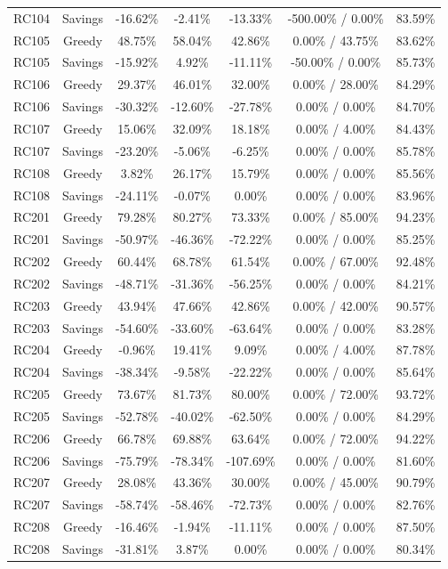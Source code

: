 \documentclass[conference]{IEEEtran}
\begin{document}
\begin{table}[htbp]
{\begin{tabular}{lcccccc}
RC104 & Savings & -16.62\% & -2.41\% & -13.33\% & -500.00\% / 0.00\% & 83.59\% \\
RC105 & Greedy & 48.75\% & 58.04\% & 42.86\% & 0.00\% / 43.75\% & 83.62\% \\
RC105 & Savings & -15.92\% & 4.92\% & -11.11\% & -50.00\% / 0.00\% & 85.73\% \\
RC106 & Greedy & 29.37\% & 46.01\% & 32.00\% & 0.00\% / 28.00\% & 84.29\% \\
RC106 & Savings & -30.32\% & -12.60\% & -27.78\% & 0.00\% / 0.00\% & 84.70\% \\
RC107 & Greedy & 15.06\% & 32.09\% & 18.18\% & 0.00\% / 4.00\% & 84.43\% \\
RC107 & Savings & -23.20\% & -5.06\% & -6.25\% & 0.00\% / 0.00\% & 85.78\% \\
RC108 & Greedy & 3.82\% & 26.17\% & 15.79\% & 0.00\% / 0.00\% & 85.56\% \\
RC108 & Savings & -24.11\% & -0.07\% & 0.00\% & 0.00\% / 0.00\% & 83.96\% \\
RC201 & Greedy & 79.28\% & 80.27\% & 73.33\% & 0.00\% / 85.00\% & 94.23\% \\
RC201 & Savings & -50.97\% & -46.36\% & -72.22\% & 0.00\% / 0.00\% & 85.25\% \\
RC202 & Greedy & 60.44\% & 68.78\% & 61.54\% & 0.00\% / 67.00\% & 92.48\% \\
RC202 & Savings & -48.71\% & -31.36\% & -56.25\% & 0.00\% / 0.00\% & 84.21\% \\
RC203 & Greedy & 43.94\% & 47.66\% & 42.86\% & 0.00\% / 42.00\% & 90.57\% \\
RC203 & Savings & -54.60\% & -33.60\% & -63.64\% & 0.00\% / 0.00\% & 83.28\% \\
RC204 & Greedy & -0.96\% & 19.41\% & 9.09\% & 0.00\% / 4.00\% & 87.78\% \\
RC204 & Savings & -38.34\% & -9.58\% & -22.22\% & 0.00\% / 0.00\% & 85.64\% \\
RC205 & Greedy & 73.67\% & 81.73\% & 80.00\% & 0.00\% / 72.00\% & 93.72\% \\
RC205 & Savings & -52.78\% & -40.02\% & -62.50\% & 0.00\% / 0.00\% & 84.29\% \\
RC206 & Greedy & 66.78\% & 69.88\% & 63.64\% & 0.00\% / 72.00\% & 94.22\% \\
RC206 & Savings & -75.79\% & -78.34\% & -107.69\% & 0.00\% / 0.00\% & 81.60\% \\
RC207 & Greedy & 28.08\% & 43.36\% & 30.00\% & 0.00\% / 45.00\% & 90.79\% \\
RC207 & Savings & -58.74\% & -58.46\% & -72.73\% & 0.00\% / 0.00\% & 82.76\% \\
RC208 & Greedy & -16.46\% & -1.94\% & -11.11\% & 0.00\% / 0.00\% & 87.50\% \\
RC208 & Savings & -31.81\% & 3.87\% & 0.00\% & 0.00\% / 0.00\% & 80.34\% \\
\bottomrule
\end{tabular}%
}


\end{table}
\end{document}
